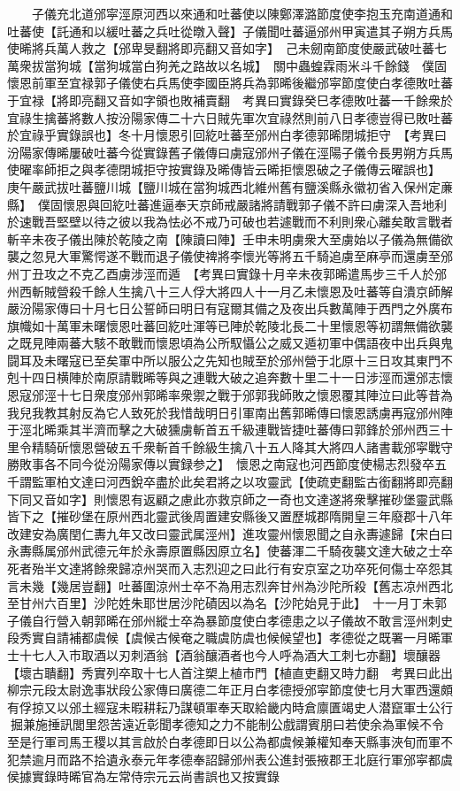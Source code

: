 　　子儀充北道邠寜涇原河西以來通和吐蕃使以陳鄭澤潞節度使李抱玉充南道通和吐蕃使【託通和以緩吐蕃之兵吐從暾入聲】子儀聞吐蕃逼邠州甲寅遣其子朔方兵馬使晞將兵萬人救之【邠卑旻翻將即亮翻又音如字】　己未劒南節度使嚴武破吐蕃七萬衆拔當狗城【當狗城當白狗羌之路故以名城】　關中蟲蝗霖雨米斗千餘錢　僕固懷恩前軍至宜禄郭子儀使右兵馬使李國臣將兵為郭晞後繼邠寜節度使白孝德敗吐蕃于宜禄【將即亮翻又音如字領也敗補賣翻　考異曰實錄癸巳孝德敗吐蕃一千餘衆於宜祿生擒蕃將數人按汾陽家傳二十六日賊先軍次宜祿然則前八日孝德豈得已敗吐蕃於宜祿乎實錄誤也】冬十月懷恩引回紇吐蕃至邠州白孝德郭晞閉城拒守　【考異曰汾陽家傳晞屢破吐蕃今從實錄舊子儀傳曰虜寇邠州子儀在涇陽子儀令長男朔方兵馬使曜率師拒之與孝德閉城拒守按實錄及晞傳皆云晞拒懷恩破之子儀傳云曜誤也】　庚午嚴武拔吐蕃鹽川城【鹽川城在當狗城西北維州舊有鹽溪縣永徽初省入保州定亷縣】　僕固懷恩與回紇吐蕃進逼奉天京師戒嚴諸將請戰郭子儀不許曰虜深入吾地利於速戰吾堅壁以待之彼以我為怯必不戒乃可破也若遽戰而不利則衆心離矣敢言戰者斬辛未夜子儀出陳於乾陵之南【陳讀曰陣】壬申未明虜衆大至虜始以子儀為無備欲襲之忽見大軍驚愕遂不戰而退子儀使禆將李懷光等將五千騎追虜至麻亭而還虜至邠州丁丑攻之不克乙酉虜涉涇而遁　【考異曰實錄十月辛未夜郭晞遣馬步三千人於邠州西斬賊營殺千餘人生擒八十三人俘大將四人十一月乙未懷恩及吐蕃等自潰京師解嚴汾陽家傳曰十月七日公誓師曰明日有寇爾其備之及夜出兵數萬陣于西門之外廣布旗幟如十萬軍未曙懷恩吐蕃回紇吐渾等已陣於乾陵北長二十里懷恩等初謂無備欲襲之既見陣兩蕃大駭不敢戰而懷恩頃為公所馭懾公之威又遁初軍中偶語夜中出兵與鬼闘耳及未曙寇已至矣軍中所以服公之先知也賊至於邠州營于北原十三日攻其東門不剋十四日横陣於南原請戰晞等與之連戰大破之追奔數十里二十一日涉涇而還邠志懷恩寇邠涇十七日衆度邠州郭晞率衆禦之戰于邠郭我師敗之懷恩覆其陣泣曰此等昔為我兒我教其射反為它人致死於我惜哉明日引軍南出舊郭晞傳曰懷恩誘虜再寇邠州陣于涇北晞乘其半濟而擊之大破獯虜斬首五千級連戰皆捷吐蕃傳曰郭鋒於邠州西三十里令精騎斫懷恩營破五千衆斬首千餘級生擒八十五人降其大將四人諸書載邠寜戰守勝敗事各不同今從汾陽家傳以實録参之】　懷恩之南寇也河西節度使楊志烈發卒五千謂監軍柏文達曰河西銳卒盡於此矣君將之以攻靈武【使疏吏翻監古銜翻將即亮翻下同又音如字】則懷恩有返顧之慮此亦救京師之一奇也文達遂將衆擊摧砂堡靈武縣皆下之【摧砂堡在原州西北靈武後周置建安縣後又置歷城郡隋開皇三年廢郡十八年改建安為廣閏仁夀九年又改曰靈武属涇州】進攻靈州懷恩聞之自永夀遽歸【宋白曰永夀縣属邠州武德元年於永壽原置縣因原立名】使蕃渾二千騎夜襲文達大破之士卒死者殆半文達將餘衆歸凉州哭而入志烈迎之曰此行有安京室之功卒死何傷士卒怨其言未幾【幾居豈翻】吐蕃圍涼州士卒不為用志烈奔甘州為沙陀所殺【舊志凉州西北至甘州六百里】沙陀姓朱耶世居沙陀磧因以為名【沙陀始見于此】　十一月丁未郭子儀自行營入朝郭晞在邠州縱士卒為暴節度使白孝德患之以子儀故不敢言涇州刺史段秀實自請補都虞候【虞候古候奄之職虞防虞也候候望也】孝德從之既署一月晞軍士十七人入市取酒以刃刺酒翁【酒翁釀酒者也今人呼為酒大工刺七亦翻】壞釀器【壞古聵翻】秀實列卒取十七人首注槊上植市門【植直吏翻又時力翻　考異曰此出柳宗元段太尉逸事狀段公家傳曰廣德二年正月白孝德授邠寜節度使七月大軍西還頗有俘掠又以邠土經寇未暇耕耘乃謀頓軍奉天取給畿内時倉廪匱竭史人潜竄軍士公行掘兼施捶訊閭里怨苦遠近彰聞孝德知之力不能制公戲謂賓朋曰若使余為軍候不令至是行軍司馬王稷以其言啟於白孝德即日以公為都虞候兼權知奉天縣事浹旬而軍不犯禁逾月而路不拾遺永泰元年孝德奉詔歸邠州表公進封張掖郡王北庭行軍邠寜都虞侯據實錄時晞官為左常侍宗元云尚書誤也又按實錄